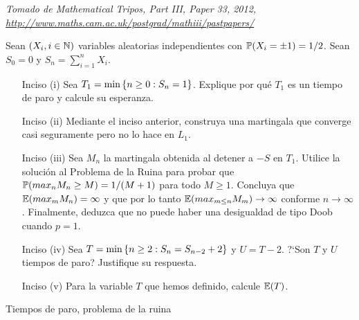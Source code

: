 \begin{problema}
	\emph{Tomado de Mathematical Tripos, Part III, Paper 33, 2012, \url{http://www.maths.cam.ac.uk/postgrad/mathiii/pastpapers/}}

	Sean ${\left( X_i,i\in\mathbb{N}\right) }$ variables aleatorias 
	independientes con ${\mathbb{P}\! \left( X_i=\pm 1 \right)=1/2}$. Sean ${S_0=0}$ y ${S_n=\sum_{i=1}^n X_i}$. 

	\begin{enumerate}
		\item[Inciso (i)] Sea ${T_1=\min\left\{ n\geq 0:S_n=1\right\} }$. Explique por qu\'e ${T_1}$ es un 
		tiempo de paro y calcule su esperanza.
		
		\item[Inciso (ii)] Mediante el inciso anterior, construya una martingala que converge 
		casi seguramente pero no lo hace en ${L_1}$.
		
		\item[Inciso (iii)] Sea ${M_n}$ la martingala obtenida al detener a ${-S}$ en ${T_1}$. Utilice la solución al
		Problema de la Ruina para probar que ${\mathbb{P}(max_n M_n \geq M) = 1/(M+1)}$ para todo ${M \geq 1}$. Concluya que
		${\mathbb{E}(max_m M_n) = \infty}$ y que por lo tanto ${\mathbb{E}(max_{m\leq n} M_m) \rightarrow \infty}$ conforme 
		${n \rightarrow \infty}$. Finalmente, deduzca que no puede haber una desigualdad de tipo Doob cuando ${p=1}$.
		
		\item[Inciso (iv)] Sea ${T=\min\left\{ n\geq 2:S_n=S_{n-2} + 2\right\} }$ y ${U=T-2}$. ?`Son ${T}$ y ${U}$ 
		tiempos de paro? Justifique su respuesta.
		
		\item[Inciso (v)] Para la variable ${T}$ que hemos definido, calcule ${\mathbb{E}\! \left( T \right)}$. 
	\end{enumerate}

	 Tiempos de paro, problema de la ruina
\end{problema}
